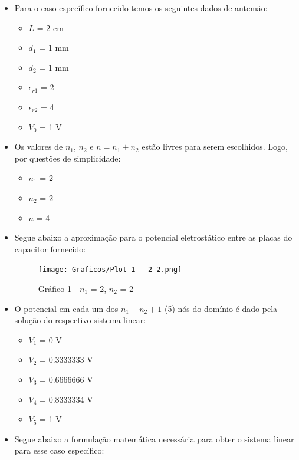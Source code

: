 \documentclass[10pt]{article}
\begin{document}
    \begin{itemize}
    \item Para o caso específico fornecido temos os seguintes dados de antemão:
        \begin{itemize}
        \item $L$ = 2 cm
        \item $d_{1}$ = 1 mm
        \item $d_{2}$ = 1 mm
        \item $\epsilon_{r1}$ = 2
        \item $\epsilon_{r2}$ = 4
        \item $V_{0}$ = 1 V
        \end{itemize}
    \item Os valores de $n_{1}$, $n_{2}$ e $n = n_{1} + n_{2}$ estão livres para serem escolhidos. Logo, por questões de simplicidade:
        \begin{itemize}
        \item $n_{1}$ = 2
        \item $n_{2}$ = 2
        \item $n$ = 4
        \end{itemize}
    \item Segue abaixo a aproximação para o potencial eletrostático entre as placas do capacitor fornecido:
    
    \begin{figure}[!htb]
    \centerline{\texttt{[image: Graficos/Plot 1 - 2 2.png]}}
    \caption{Gráfico 1 - $n_{1}$ = 2, $n_{2}$ = 2 }
    \label{fig:fp14}
    \end{figure}
    
    \newpage
    \item O potencial em cada um dos $n_{1} + n_{2} + 1$ (5) nós do domínio é dado pela solução do respectivo sistema linear:
        \begin{itemize}
        \item $V_{1}$ = 0 V
        \item $V_{2}$ = 0.3333333 V
        \item $V_{3}$ = 0.6666666 V
        \item $V_{4}$ = 0.8333334 V
        \item $V_{5}$ = 1 V
        \end{itemize}
    \item Segue abaixo a formulação matemática necessária para obter o sistema linear para esse caso específico:
    

\end{itemize}
\end{document}
